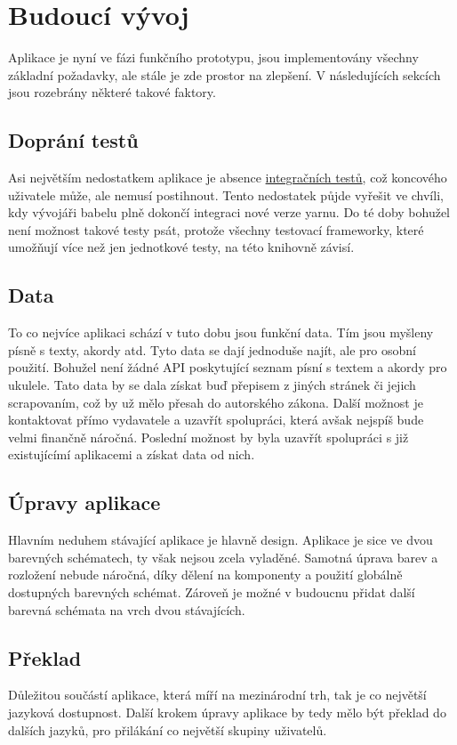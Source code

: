 \section{Budoucí vývoj}
\label{sc:upcomming_development}
Aplikace je nyní ve fázi funkčního prototypu, jsou implementovány všechny základní požadavky, ale stále je zde prostor na zlepšení. V následujících sekcích jsou rozebrány některé takové faktory.

\subsection{Doprání testů}
Asi největším nedostatkem aplikace je absence \hyperref[sc:unit_tests]{integračních testů}, což koncového uživatele může, ale nemusí postihnout. Tento nedostatek půjde vyřešit ve chvíli, kdy vývojáři babelu plně dokončí integraci nové verze yarnu. Do té doby bohužel není možnost takové testy psát, protože všechny testovací frameworky, které umožňují více než jen jednotkové testy, na této knihovně závisí.

\subsection{Data}
To co nejvíce aplikaci schází v tuto dobu jsou funkční data. Tím jsou myšleny písně s texty, akordy atd. Tyto data se dají jednoduše najít, ale pro osobní použití. Bohužel není žádné API poskytující seznam písní s textem a akordy pro ukulele. Tato data by se dala získat buď přepisem z jiných stránek či jejich scrapovaním, což by už mělo přesah do autorského zákona. Další možnost je kontaktovat přímo vydavatele a uzavřít spolupráci, která avšak nejspíš bude velmi finančně náročná. Poslední možnost by byla uzavřít spolupráci s již existujícímí aplikacemi a získat data od nich.

\subsection{Úpravy aplikace}
Hlavním neduhem stávající aplikace je hlavně design. Aplikace je sice ve dvou barevných schématech, ty však nejsou zcela vyladěné. Samotná úprava barev a rozložení nebude náročná, díky dělení na komponenty a použití globálně dostupných barevných schémat. Zároveň je možné v budoucnu přidat další barevná schémata na vrch dvou stávajících.

\subsection{Překlad}
Důležitou součástí aplikace, která míří na mezinárodní trh, tak je co největší jazyková dostupnost. Další krokem úpravy aplikace by tedy mělo být překlad do dalších jazyků, pro přilákání co největší skupiny uživatelů.

